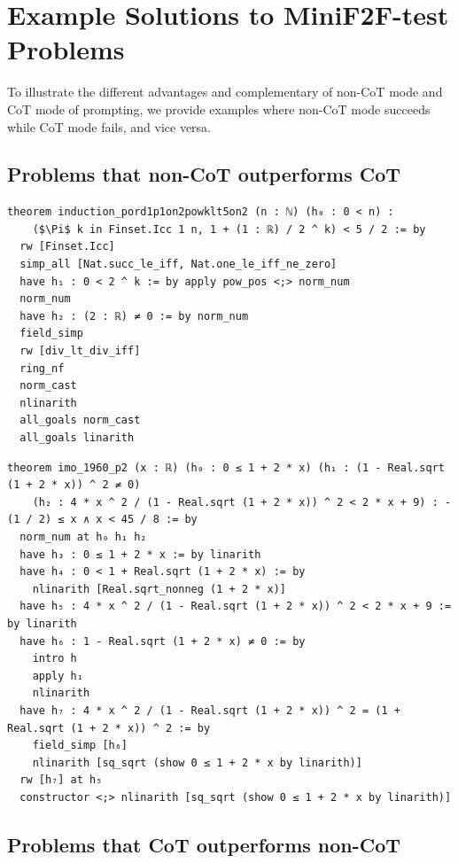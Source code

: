 \section{Example Solutions to MiniF2F-test Problems} \label{apx:solutions}

To illustrate the different advantages and complementary of non-CoT mode and CoT mode of prompting, we provide examples where non-CoT mode succeeds while CoT mode fails, and vice versa.

\subsection{Problems that non-CoT outperforms CoT}

\begin{lstlisting}[frame=single]
theorem induction_pord1p1on2powklt5on2 (n : ℕ) (h₀ : 0 < n) :
    ($\Pi$ k in Finset.Icc 1 n, 1 + (1 : ℝ) / 2 ^ k) < 5 / 2 := by
  rw [Finset.Icc]
  simp_all [Nat.succ_le_iff, Nat.one_le_iff_ne_zero]
  have h₁ : 0 < 2 ^ k := by apply pow_pos <;> norm_num
  norm_num
  have h₂ : (2 : ℝ) ≠ 0 := by norm_num
  field_simp
  rw [div_lt_div_iff]
  ring_nf
  norm_cast
  nlinarith
  all_goals norm_cast
  all_goals linarith
\end{lstlisting}

\begin{lstlisting}[frame=single]
theorem imo_1960_p2 (x : ℝ) (h₀ : 0 ≤ 1 + 2 * x) (h₁ : (1 - Real.sqrt (1 + 2 * x)) ^ 2 ≠ 0)
    (h₂ : 4 * x ^ 2 / (1 - Real.sqrt (1 + 2 * x)) ^ 2 < 2 * x + 9) : -(1 / 2) ≤ x ∧ x < 45 / 8 := by
  norm_num at h₀ h₁ h₂
  have h₃ : 0 ≤ 1 + 2 * x := by linarith
  have h₄ : 0 < 1 + Real.sqrt (1 + 2 * x) := by
    nlinarith [Real.sqrt_nonneg (1 + 2 * x)]
  have h₅ : 4 * x ^ 2 / (1 - Real.sqrt (1 + 2 * x)) ^ 2 < 2 * x + 9 := by linarith
  have h₆ : 1 - Real.sqrt (1 + 2 * x) ≠ 0 := by
    intro h
    apply h₁
    nlinarith
  have h₇ : 4 * x ^ 2 / (1 - Real.sqrt (1 + 2 * x)) ^ 2 = (1 + Real.sqrt (1 + 2 * x)) ^ 2 := by
    field_simp [h₆]
    nlinarith [sq_sqrt (show 0 ≤ 1 + 2 * x by linarith)]
  rw [h₇] at h₅
  constructor <;> nlinarith [sq_sqrt (show 0 ≤ 1 + 2 * x by linarith)]
\end{lstlisting}

\subsection{Problems that CoT outperforms non-CoT}

